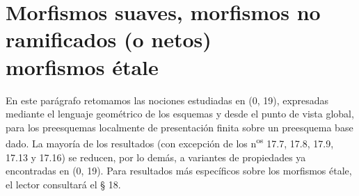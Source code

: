 \section[Morfismos suaves, morfismos no ramificados (o netos), morfismos étale]{Morfismos suaves, morfismos no ramificados (o netos)\\morfismos étale}
\label{section:IV.17}

En este parágrafo retomamos las nociones estudiadas en (0, 19), expresadas mediante el lenguaje geométrico de los esquemas y desde el punto de vista global, para los preesquemas localmente de presentación finita sobre un preesquema base dado. La mayoría de los resultados (con excepción de los n\textsuperscript{os} 17.7, 17.8, 17.9, 17.13 y 17.16) se reducen, por lo demás, a variantes de propiedades ya encontradas en (0, 19). Para resultados más específicos sobre los morfismos étale, el lector consultará el § 18.
